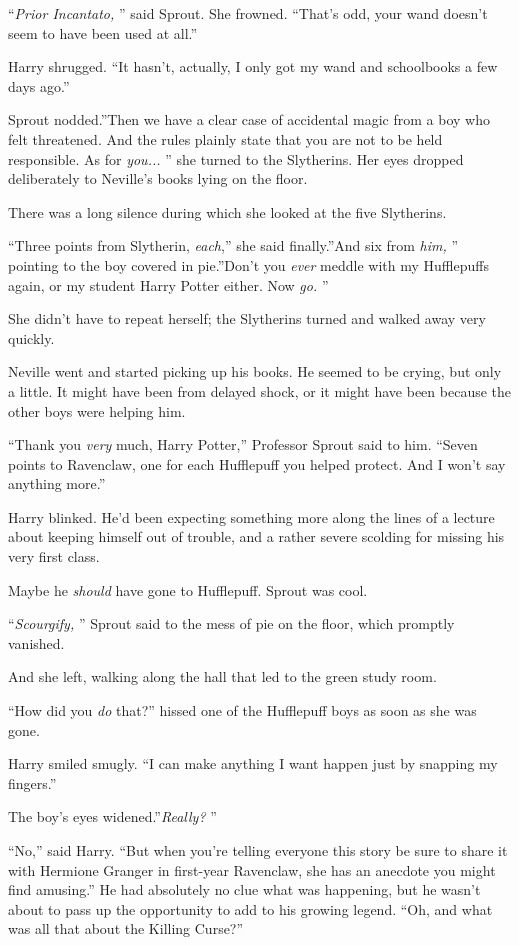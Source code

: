 ``\emph{Prior Incantato,} '' said Sprout. She frowned. ``That's odd, your
wand doesn't seem to have been used at all.''

Harry shrugged. ``It hasn't, actually, I only got my wand and
schoolbooks a few days ago.''

Sprout nodded.''Then we have a clear case of accidental magic from a boy
who felt threatened. And the rules plainly state that you are not to be
held responsible. As for \emph{you...} '' she turned to the
Slytherins. Her eyes dropped deliberately to Neville's books lying on
the floor.

There was a long silence during which she looked at the five Slytherins.

``Three points from Slytherin, \emph{each},'' she said finally.''And six
from \emph{him,} '' pointing to the boy covered in pie.''Don't you
\emph{ever} meddle with my Hufflepuffs again, or my student Harry Potter
either. Now \emph{go.} ''

She didn't have to repeat herself; the Slytherins turned and walked away
very quickly.

Neville went and started picking up his books. He seemed to be crying,
but only a little. It might have been from delayed shock, or it might
have been because the other boys were helping him.

``Thank you \emph{very} much, Harry Potter,'' Professor Sprout said to
him. ``Seven points to Ravenclaw, one for each Hufflepuff you helped
protect. And I won't say anything more.''

Harry blinked. He'd been expecting something more along the lines of a
lecture about keeping himself out of trouble, and a rather severe
scolding for missing his very first class.

Maybe he \emph{should} have gone to Hufflepuff. Sprout was cool.

``\emph{Scourgify,} '' Sprout said to the mess of pie on the floor, which
promptly vanished.

And she left, walking along the hall that led to the green study room.

``How did you \emph{do} that?'' hissed one of the Hufflepuff boys as soon
as she was gone.

Harry smiled smugly. ``I can make anything I want happen just by
snapping my fingers.''

The boy's eyes widened.''\emph{Really?} ''

``No,'' said Harry. ``But when you're telling everyone this story be
sure to share it with Hermione Granger in first-year Ravenclaw, she has
an anecdote you might find amusing.'' He had absolutely no clue what was
happening, but he wasn't about to pass up the opportunity to add to his
growing legend. ``Oh, and what was all that about the Killing Curse?''

